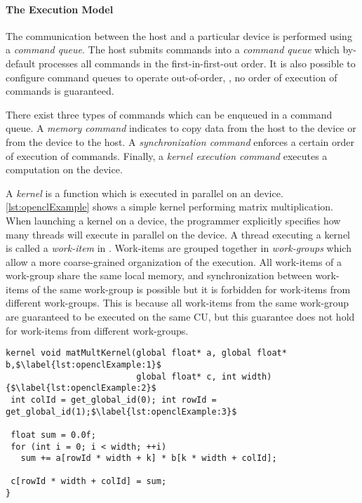 \paragraph{The \OpenCL Execution Model}
The communication between the host and a particular device is performed using a \emph{command queue}.
The host submits commands into a \emph{command queue} which by-default processes all commands in the first-in-first-out order.
It is also possible to configure command queues to operate out-of-order, \ie, no order of execution of commands is guaranteed.

There exist three types of commands which can be enqueued in a command queue.
A \emph{memory command} indicates to copy data from the host to the device or from the device to the host.
A \emph{synchronization command} enforces a certain order of execution of commands.
Finally, a \emph{kernel execution command} executes a computation on the device.

A \emph{kernel} is a function which is executed in parallel on an \OpenCL device.
\autoref{lst:openclExample} shows a simple \OpenCL kernel performing matrix multiplication.
When launching a kernel on a device, the programmer explicitly specifies how many threads will execute in parallel on the device.
A thread executing a kernel is called a \emph{work-item} in \OpenCL.
Work-items are grouped together in \emph{work-groups} which allow a more coarse-grained organization of the execution.
All work-items of a work-group share the same local memory, and synchronization between work-items of the same work-group is possible but it is forbidden for work-items from different work-groups.
This is because all work-items from the same work-group are guaranteed to be executed on the same CU, but this guarantee does not hold for work-items from different work-groups.

\begin{lstlisting}[float, caption={Example of an \OpenCL kernel.}, label={lst:openclExample}]
kernel void matMultKernel(global float* a, global float* b,$\label{lst:openclExample:1}$
                          global float* c, int width) {$\label{lst:openclExample:2}$
 int colId = get_global_id(0); int rowId = get_global_id(1);$\label{lst:openclExample:3}$

 float sum = 0.0f;
 for (int i = 0; i < width; ++i)
   sum += a[rowId * width + k] * b[k * width + colId];

 c[rowId * width + colId] = sum;
}
\end{lstlisting}

